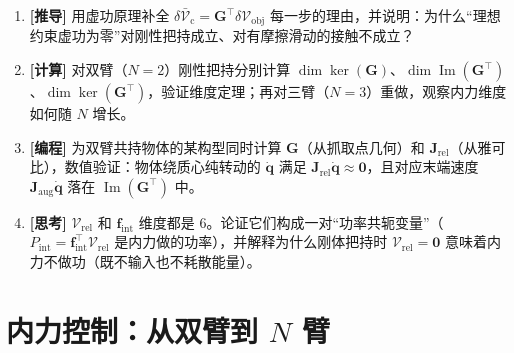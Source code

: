 \begin{exercise}
\begin{enumerate}
  \item \textbf{[推导]} 用虚功原理补全 $\delta\bar{\boldsymbol{\mathcal{V}}}_{\text{c}}=\mathbf{G}^\top\delta\boldsymbol{\mathcal{V}}_{\text{obj}}$ 每一步的理由，并说明：为什么“理想约束虚功为零”对刚性把持成立、对有摩擦滑动的接触不成立？
  \item \textbf{[计算]} 对双臂（$N=2$）刚性把持分别计算 $\dim\ker(\mathbf{G})$、$\dim\operatorname{Im}(\mathbf{G}^\top)$、$\dim\ker(\mathbf{G}^\top)$，验证维度定理；再对三臂（$N=3$）重做，观察内力维度如何随 $N$ 增长。
  \item \textbf{[编程]} 为双臂共持物体的某构型同时计算 $\mathbf{G}$（从抓取点几何）和 $\mathbf{J}_{\text{rel}}$（从雅可比），数值验证：物体绕质心纯转动的 $\dot{\mathbf{q}}$ 满足 $\mathbf{J}_{\text{rel}}\dot{\mathbf{q}}\approx\mathbf{0}$，且对应末端速度 $\mathbf{J}_{\text{aug}}\dot{\mathbf{q}}$ 落在 $\operatorname{Im}(\mathbf{G}^\top)$ 中。
  \item \textbf{[思考]} $\boldsymbol{\mathcal{V}}_{\text{rel}}$ 和 $\mathbf{f}_{\text{int}}$ 维度都是 $6$。论证它们构成一对“功率共轭变量”（$P_{\text{int}}=\mathbf{f}_{\text{int}}^\top\boldsymbol{\mathcal{V}}_{\text{rel}}$ 是内力做的功率），并解释为什么刚体把持时 $\boldsymbol{\mathcal{V}}_{\text{rel}}=\mathbf{0}$ 意味着内力不做功（既不输入也不耗散能量）。
\end{enumerate}
\end{exercise}

\section{内力控制：从双臂到 \texorpdfstring{$N$}{N} 臂}
\label{sec:ma-internalforce}


